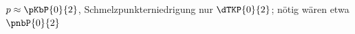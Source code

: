 $p \approx \pKbP{0}{2}$, Schmelzpunkterniedrigung nur $\dTKP{0}{2}$; nötig wären etwa $\pnbP{0}{2}$
